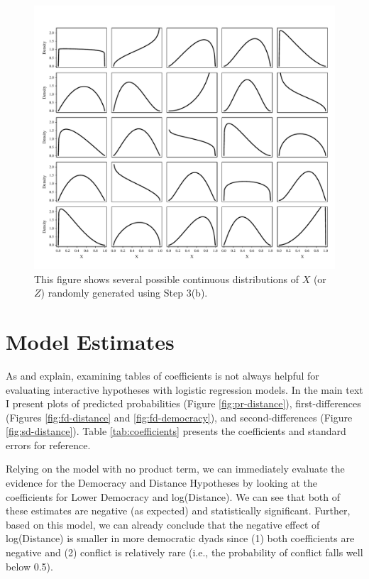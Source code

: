 \documentclass[12pt]{article}
\begin{document}
\begin{appendix}
                                \begin{figure}[h]
        \begin{center}
        \includegraphics[width = \linewidth]{fig/fig-distribution-sample.pdf}
        \end{center}\caption{This figure shows several possible continuous distributions of $X$ (or $Z$) randomly generated using Step 3(b). }\label{fig:distribution-sample}
        \end{figure}
        
\clearpage        
        
\section*{Model Estimates}

As \cite{BramborClarkGolder2006} and \cite{BerryDeMerittEsarey2010} explain, examining tables of coefficients is not always helpful for evaluating interactive hypotheses with logistic regression models. In the main text I present plots of predicted probabilities (Figure \ref{fig:pr-distance}), first-differences (Figures \ref{fig:fd-distance} and \ref{fig:fd-democracy}), and second-differences (Figure \ref{fig:sd-distance}). Table \ref{tab:coefficients} presents the coefficients and standard errors for reference.

Relying on the model with no product term, we can immediately evaluate the evidence for the Democracy and Distance Hypotheses by looking at the coefficients for Lower Democracy and log(Distance). We can see that both of these estimates are negative (as expected) and statistically significant. Further, based on this model, we can already conclude that the negative effect of log(Distance) is smaller in more democratic dyads since (1) both coefficients are negative and (2) conflict is relatively rare (i.e., the probability of conflict falls well below 0.5).


\end{appendix}
\end{document}
